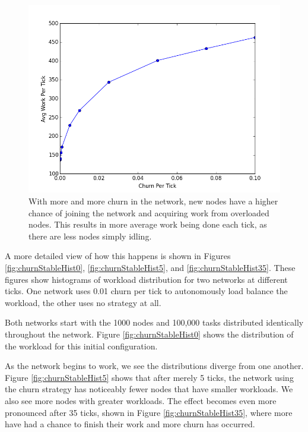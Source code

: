 \documentclass[11pt,conference]{IEEEtran}
\begin{document}
{	\begin{figure}
		\centering
		\includegraphics[width=0.7\linewidth]{figs/churnVsWork}
		\caption[Churn vs average work per tick]{With more and more churn in the network, new nodes have a higher chance of joining the network and acquiring work from overloaded nodes.  This results in more average work being done each tick, as there are less nodes simply idling.}
		\label{fig:churnVsWork}
	\end{figure}
	
	
	
	A more detailed view of how this happens is shown in Figures \ref{fig:churnStableHist0}, \ref{fig:churnStableHist5}, and \ref{fig:churnStableHist35}.
	These figures show histograms of workload distribution for two networks at different ticks.
	One network uses 0.01 churn per tick to autonomously load balance the workload, the other uses no strategy at all.
	
	Both networks start with the 1000 nodes and 100,000 tasks distributed identically throughout the network. 
	Figure \ref{fig:churnStableHist0} shows the distribution of the workload for this initial configuration.
	
	As the network begins to work, we see the distributions diverge from one another.
	Figure \ref{fig:churnStableHist5} shows that after merely 5 ticks, the network using the churn strategy has noticeably fewer nodes that have smaller workloads.
	We also see more nodes with greater workloads.
	The effect becomes even more pronounced after 35 ticks, shown in Figure \ref{fig:churnStableHist35}, where more have had a chance to finish their work and more churn has occurred.
	
}
\end{document}
